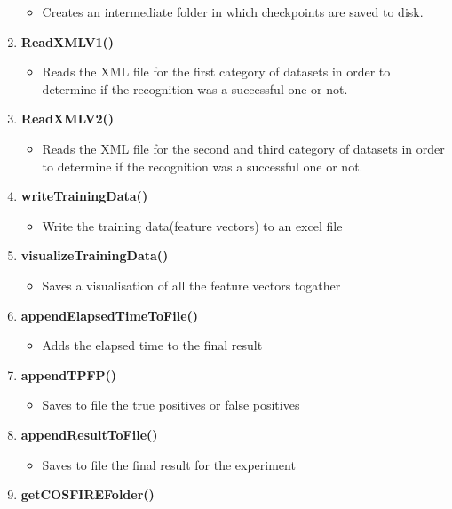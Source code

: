 \begin{enumerate}
    \begin{itemize}
        \item Creates an intermediate folder in which checkpoints are saved to disk.
    \end{itemize}
    \item {\bf ReadXMLV1()}
    \begin{itemize}
        \item Reads the XML file for the first category of datasets in order to determine if the recognition was a successful one or not.
    \end{itemize}
    \item {\bf ReadXMLV2()}
    \begin{itemize}
        \item Reads the XML file for the second and third category of datasets in order to determine if the recognition was a successful one or not.
    \end{itemize}
    \item {\bf writeTrainingData()}
    \begin{itemize}
        \item Write the training data(feature vectors) to an excel file
    \end{itemize}
    \item {\bf visualizeTrainingData()}
    \begin{itemize}
        \item Saves a visualisation of all the feature vectors togather
    \end{itemize}
    \item {\bf appendElapsedTimeToFile()}
    \begin{itemize}
        \item Adds the elapsed time to the final result
    \end{itemize}
    \item {\bf appendTPFP()}
    \begin{itemize}
        \item Saves to file the true positives or false positives
    \end{itemize}
    \item {\bf appendResultToFile()}
    \begin{itemize}
        \item Saves to file the final result for the experiment
    \end{itemize}
    \item {\bf getCOSFIREFolder()}
    \begin{itemize}

\end{itemize}
\end{enumerate}
